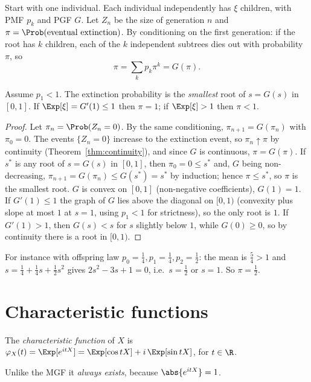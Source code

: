 \begin{example}\label{ex:branching}
Start with one individual. Each individual independently has $\xi$ children, with
PMF $p_k$ and PGF $G$. Let $Z_n$ be the size of generation $n$ and
$\pi=\Prob(\text{eventual extinction})$. By conditioning on the first generation: if
the root has $k$ children, each of the $k$ independent subtrees dies out with
probability $\pi$, so
\[
\pi=\sum_kp_k\pi^k=G(\pi).
\]
\begin{theorem}\label{thm:extinction}
Assume $p_1<1$. The extinction probability is the \emph{smallest} root of
$s=G(s)$ in $[0,1]$. If $\Exp[\xi]=G'(1)\le1$ then $\pi=1$; if $\Exp[\xi]>1$ then $\pi<1$.
\end{theorem}
\begin{proof}
Let $\pi_n=\Prob(Z_n=0)$. By the same conditioning, $\pi_{n+1}=G(\pi_n)$ with
$\pi_0=0$. The events $\{Z_n=0\}$ increase to the extinction event, so
$\pi_n\uparrow\pi$ by continuity (Theorem~\ref{thm:continuity}), and since $G$ is
continuous, $\pi=G(\pi)$. If $s^*$ is any root of $s=G(s)$ in $[0,1]$, then
$\pi_0=0\le s^*$ and, $G$ being non-decreasing, $\pi_{n+1}=G(\pi_n)\le G(s^*)=s^*$ by
induction; hence $\pi\le s^*$, so $\pi$ is the smallest root. $G$ is convex on $[0,1]$
(non-negative coefficients), $G(1)=1$. If $G'(1)\le1$ the graph of $G$ lies above the
diagonal on $[0,1)$ (convexity plus slope at most $1$ at $s=1$, using $p_1<1$ for
strictness), so the only root is $1$. If $G'(1)>1$, then $G(s)<s$ for $s$ slightly
below $1$, while $G(0)\ge0$, so by continuity there is a root in $[0,1)$.
\end{proof}
For instance with offspring law $p_0=\tfrac14,p_1=\tfrac14,p_2=\tfrac12$: the mean is
$\tfrac54>1$ and $s=\tfrac14+\tfrac14s+\tfrac12s^2$ gives
$2s^2-3s+1=0$, i.e.\ $s=\tfrac12$ or $s=1$. So $\pi=\tfrac12$.
\end{example}

\section{Characteristic functions}\label{sec:cf}

\begin{definition}
The \emph{characteristic function} of $X$ is
$\varphi_X(t)=\Exp[e^{itX}]=\Exp[\cos tX]+i\,\Exp[\sin tX]$, for $t\in\R$.
\end{definition}

Unlike the MGF it \emph{always exists}, because $\abs{e^{itX}}=1$.

